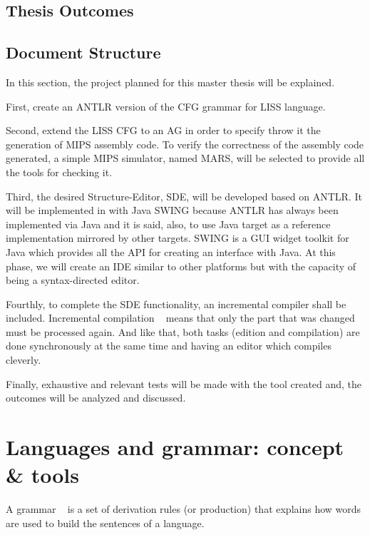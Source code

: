\documentclass[
  oneside,
  11pt, a4paper,
  footinclude=true,
  headinclude=true,
  cleardoublepage=empty
]{scrbook}
\begin{document}
\section{Thesis Outcomes}

\section{Document Structure}	

In this section, the project planned for this master thesis will be explained.


First, create an ANTLR version of the CFG grammar for LISS language.


Second, extend the LISS CFG to an AG in order to specify throw it the generation of MIPS assembly code.
To verify the correctness of the assembly code generated, a simple MIPS simulator, named MARS, will be selected to provide all the tools for checking it.

Third, the desired Structure-Editor, SDE, will be developed based on ANTLR.
It will be implemented in with Java SWING because ANTLR has always been implemented via Java and it is said, also, to use Java target as a reference implementation mirrored by other targets.
SWING is a GUI widget toolkit for Java which provides all the API for creating an interface with Java.
At this phase, we will create an IDE similar to other platforms but with the capacity of being a syntax-directed editor.

Fourthly, to complete the SDE functionality, an incremental compiler shall be included.
Incremental compilation ~\citep{RTD83a,Hol87a,VSK90a} means that only the part that was changed must be processed again. And like that, both tasks (edition and compilation) are done synchronously at the same time and having an editor which compiles cleverly.

Finally, exhaustive and relevant tests will be made with the tool created and, the outcomes will be analyzed and discussed.


\chapter{Languages and grammar: concept \& tools}
A grammar ~\citep{Chomsky62a,Gau83a,WG84a,ASU86a,Kas91c,Muchnick97,Hopcroft2006b,Grune2012a} is a set of derivation rules (or production) that explains how words are used to build the sentences of a language.
\end{document}

